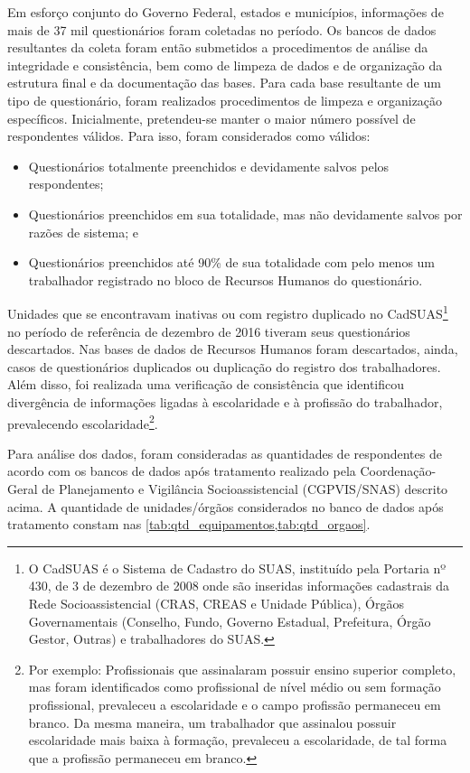 \documentclass[brazilian]{report}
\begin{document}
Em esforço conjunto do Governo Federal, estados e municípios, informações de mais de 37 mil questionários foram coletadas no período. Os bancos de dados resultantes da coleta foram então submetidos a procedimentos de análise da integridade e consistência, bem como de limpeza de dados e de organização da estrutura final e da documentação das bases. Para cada base resultante de um tipo de questionário, foram realizados procedimentos de limpeza e organização específicos. Inicialmente, pretendeu-se manter o maior número possível de respondentes válidos. Para isso, foram considerados como válidos:

\begin{itemize}
  \item 
Questionários totalmente preenchidos e devidamente salvos pelos respondentes;
  \item 
Questionários preenchidos em sua totalidade, mas não devidamente salvos por razões de sistema; e
  \item 
Questionários preenchidos até 90\% de sua totalidade com pelo menos um trabalhador registrado no bloco de Recursos Humanos do questionário.
\end{itemize}

Unidades que se encontravam inativas ou com registro duplicado no CadSUAS\footnote{O CadSUAS é o Sistema de Cadastro do SUAS, instituído pela Portaria nº 430, de 3 de dezembro de 2008 onde são inseridas informações cadastrais da Rede Socioassistencial (CRAS, CREAS e Unidade Pública), Órgãos Governamentais (Conselho, Fundo, Governo Estadual, Prefeitura, Órgão Gestor, Outras) e trabalhadores do SUAS.} no período de referência de dezembro de 2016 tiveram seus questionários descartados. Nas bases de dados de Recursos Humanos foram descartados, ainda, casos de questionários duplicados ou duplicação do registro dos trabalhadores. Além disso, foi realizada uma verificação de consistência que identificou divergência de informações ligadas à escolaridade e à profissão do trabalhador, prevalecendo escolaridade\footnote{Por exemplo: Profissionais que assinalaram possuir ensino superior completo, mas foram identificados como profissional de nível médio ou sem formação profissional, prevaleceu a escolaridade e o campo profissão permaneceu em branco. Da mesma maneira, um trabalhador que assinalou possuir escolaridade mais baixa à formação, prevaleceu a escolaridade, de tal forma que a profissão permaneceu em branco.}.

Para análise dos dados, foram consideradas as quantidades de respondentes de acordo com os bancos de dados após tratamento realizado pela Coordenação-Geral de Planejamento e Vigilância Socioassistencial (CGPVIS/SNAS) descrito acima. A quantidade de unidades/órgãos considerados no banco de dados após tratamento constam nas \cref{tab:qtd_equipamentos,tab:qtd_orgaos}.
\end{document}
